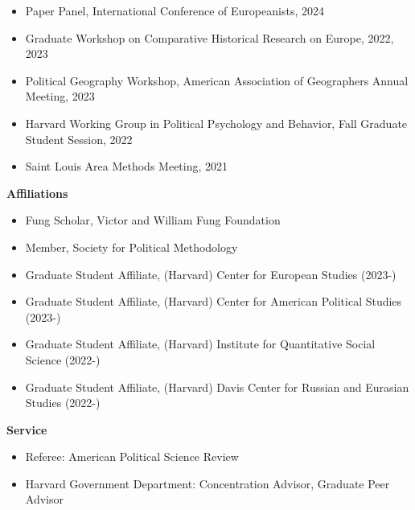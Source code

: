 \documentclass[12pt]{article}
\begin{document}
\begin{footnotesize}
\begin{itemize}[noitemsep,nolistsep]
\item Paper Panel, International Conference of Europeanists, 2024

\item Graduate Workshop on Comparative Historical Research on Europe, 2022, 2023

\item Political Geography Workshop, American Association of Geographers Annual Meeting, 2023

\item Harvard Working Group in Political Psychology and Behavior, Fall Graduate Student Session, 2022

\item Saint Louis Area Methods Meeting, 2021

\end{itemize}


\vspace{5mm} 


{\bf {\normalsize Affiliations}}

\vspace{3mm} 

\begin{itemize}[noitemsep,nolistsep]

\item Fung Scholar, Victor and William Fung Foundation

\item Member, Society for Political Methodology

\item Graduate Student Affiliate, (Harvard) Center for European Studies (2023-)

\item Graduate Student Affiliate, (Harvard) Center for American Political Studies (2023-)

\item Graduate Student Affiliate, (Harvard) Institute for Quantitative Social Science (2022-)

\item Graduate Student Affiliate, (Harvard) Davis Center for Russian and Eurasian Studies (2022-)

\end{itemize}

\vspace{5mm} 


{\bf {\normalsize Service}}

\vspace{3mm} 

\begin{itemize}[noitemsep,nolistsep]
\item Referee: American Political Science Review
\item Harvard Government Department: Concentration Advisor, Graduate Peer Advisor 
\end{itemize}

\end{footnotesize}
\thispagestyle{empty}
\end{document}
